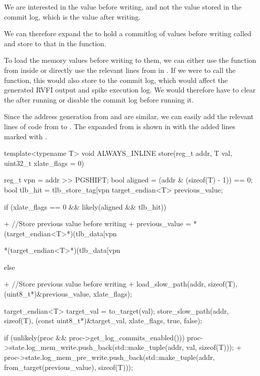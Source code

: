 We are interested in the value before writing, and not the value stored in the commit log, which is the value after writing. 

We can therefore expand the  to hold a commitlog of values before writing called  and store to that in the  function.

To load the memory values before writing to them, we can either use the  function from inside  or directly use the relevant lines from  in . If we were to call the  function, this would also store to the  commit log, which would affect the generated RVFI output and spike execution log. We would therefore have to clear the  after running  or disable the commit log before running it.

Since the address generation from  and  are similar, we can easily add the relevant lines of code from  to . The expanded  from  is shown in  with the added lines marked with \ccode{+}.


\begin{clisting}[caption={Modified \ccode{store()} function from \file{mmu.h} with new lines marked with \ccode{+}.}, label={lst:store}]
  template<typename T>
  void ALWAYS_INLINE store(reg_t addr, T val, uint32_t xlate_flags = 0) {
    reg_t vpn = addr >> PGSHIFT;
    bool aligned = (addr & (sizeof(T) - 1)) == 0;
    bool tlb_hit = tlb_store_tag[vpn %
    target_endian<T> previous_value;


    if (xlate_flags == 0 && likely(aligned && tlb_hit)) {
+     //Store previous value before writing
+     previous_value = *(target_endian<T>*)(tlb_data[vpn %

      *(target_endian<T>*)(tlb_data[vpn %
    } else {
+     //Store previous value before writing
+     load_slow_path(addr, sizeof(T), (uint8_t*)&previous_value, xlate_flags);

      target_endian<T> target_val = to_target(val);
      store_slow_path(addr, sizeof(T), (const uint8_t*)&target_val, xlate_flags, true, false);
    }

    if (unlikely(proc && proc->get_log_commits_enabled())) {
      proc->state.log_mem_write.push_back(std::make_tuple(addr, val, sizeof(T)));
+     proc->state.log_mem_pre_write.push_back(std::make_tuple(addr, from_target(previous_value), sizeof(T)));
    }
  }
\end{clisting}



